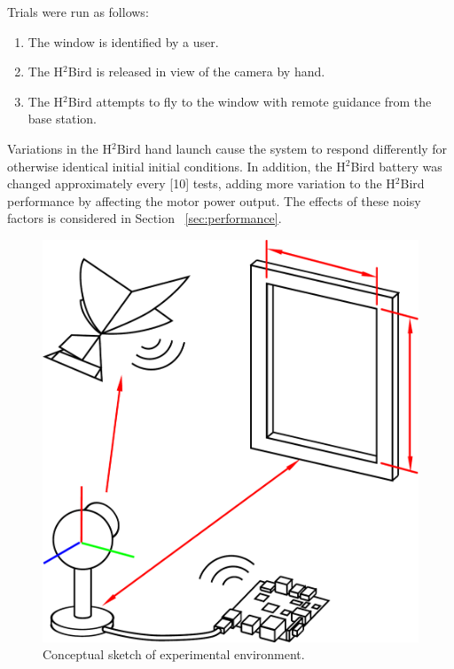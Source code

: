 \documentclass{aamas2013}
\begin{document}
Trials were run as follows:
\begin{enumerate}
\item The window is identified by a user. 
\item The H$^2$Bird is released in view of the camera by hand.
\item The H$^2$Bird attempts to fly to the window with remote guidance from
the base station.
\end{enumerate}

Variations in the H$^2$Bird hand launch cause the system to respond differently 
for otherwise identical initial initial conditions. In addition, the H$^2$Bird 
battery was changed approximately every [10] tests, adding more variation to
the H$^2$Bird performance by affecting the motor power output. The effects of 
these noisy factors is considered in Section ~\ref{sec:performance}.

\begin{figure}[tb]
\centering
\includegraphics[width=\linewidth]{figures/experiment_cartoon.pdf}
\caption{Conceptual sketch of experimental environment.}
\label{fig:experiment_cartoon}
\end{figure}
\end{document}
